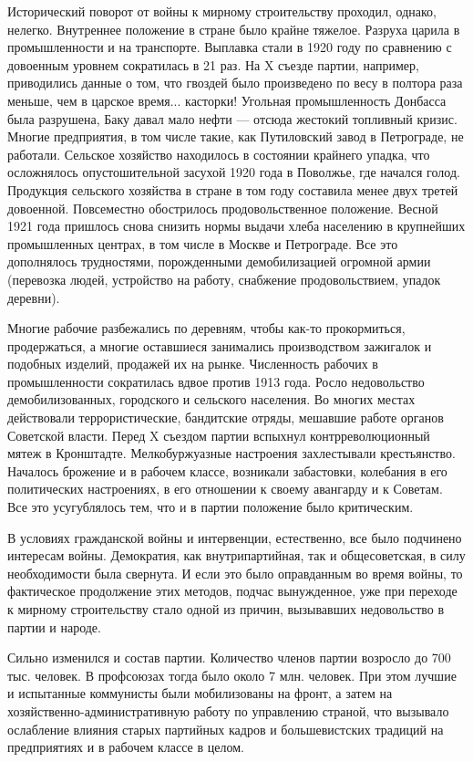 \documentclass[12pt, a4paper, openany]{book}
\begin{document}
Исторический поворот от войны к мирному строительству проходил, однако, нелегко. Внутреннее положение в стране было крайне тяжелое. Разруха царила в промышленности и на транспорте. Выплавка стали в 1920 году по сравнению с довоенным уровнем сократилась в 21 раз. На X съезде партии, например, приводились данные о том, что гвоздей было произведено по весу в полтора раза меньше, чем в царское время... касторки! Угольная промышленность Донбасса была разрушена, Баку давал мало нефти — отсюда жестокий топливный кризис. Многие предприятия, в том числе такие, как Путиловский завод в Петрограде, не работали. Сельское хозяйство находилось в состоянии крайнего упадка, что осложнялось опустошительной засухой 1920 года в Поволжье, где начался голод. Продукция сельского хозяйства в стране в том году составила менее двух третей довоенной. Повсеместно обострилось продовольственное положение. Весной 1921 года пришлось снова снизить нормы выдачи хлеба населению в крупнейших промышленных центрах, в том числе в Москве и Петрограде. Все это дополнялось трудностями, порожденными демобилизацией огромной армии (перевозка людей, устройство на работу, снабжение продовольствием, упадок деревни).

Многие рабочие разбежались по деревням, чтобы как-то прокормиться, продержаться, а многие оставшиеся занимались производством зажигалок и подобных изделий, продажей их на рынке. Численность рабочих в промышленности сократилась вдвое против 1913 года. Росло недовольство демобилизованных, городского и сельского населения. Во многих местах действовали террористические, бандитские отряды, мешавшие работе органов Советской власти. Перед X съездом партии вспыхнул контрреволюционный мятеж в Кронштадте. Мелкобуржуазные настроения захлестывали крестьянство. Началось брожение и в рабочем классе, возникали забастовки, колебания в его политических настроениях, в его отношении к своему авангарду и к Советам. Все это усугублялось тем, что и в партии положение было критическим.

В условиях гражданской войны и интервенции, естественно, все было подчинено интересам войны. Демократия, как внутрипартийная, так и общесоветская, в силу необходимости была свернута. И если это было оправданным во время войны, то фактическое продолжение этих методов, подчас вынужденное, уже при переходе к мирному строительству стало одной из причин, вызывавших недовольство в партии и народе.

Сильно изменился и состав партии. Количество членов партии возросло до 700 тыс. человек. В профсоюзах тогда было около 7 млн. человек. При этом лучшие и испытанные коммунисты были мобилизованы на фронт, а затем на хозяйственно-административную работу по управлению страной, что вызывало ослабление влияния старых партийных кадров и большевистских традиций на предприятиях и в рабочем классе в целом.
\end{document}
